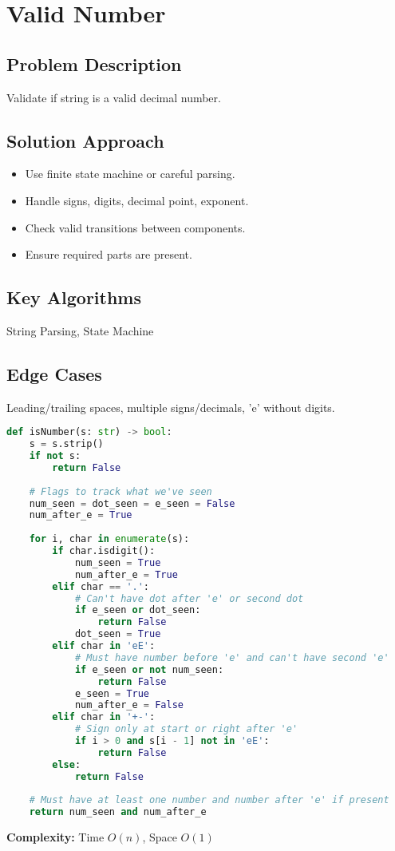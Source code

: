 \documentclass[10pt, a4paper]{article}
\begin{document}
\section{Valid Number}
\subsection*{Problem Description}
Validate if string is a valid decimal number.

\subsection*{Solution Approach}
\begin{itemize}
    \item Use finite state machine or careful parsing.
    \item Handle signs, digits, decimal point, exponent.
    \item Check valid transitions between components.
    \item Ensure required parts are present.
\end{itemize}

\subsection*{Key Algorithms}
String Parsing, State Machine

\subsection*{Edge Cases}
Leading/trailing spaces, multiple signs/decimals, 'e' without digits.

\begin{lstlisting}[language=Python]
def isNumber(s: str) -> bool:
    s = s.strip()
    if not s:
        return False
    
    # Flags to track what we've seen
    num_seen = dot_seen = e_seen = False
    num_after_e = True
    
    for i, char in enumerate(s):
        if char.isdigit():
            num_seen = True
            num_after_e = True
        elif char == '.':
            # Can't have dot after 'e' or second dot
            if e_seen or dot_seen:
                return False
            dot_seen = True
        elif char in 'eE':
            # Must have number before 'e' and can't have second 'e'
            if e_seen or not num_seen:
                return False
            e_seen = True
            num_after_e = False
        elif char in '+-':
            # Sign only at start or right after 'e'
            if i > 0 and s[i - 1] not in 'eE':
                return False
        else:
            return False
    
    # Must have at least one number and number after 'e' if present
    return num_seen and num_after_e
\end{lstlisting}
\textbf{Complexity:} Time $O(n)$, Space $O(1)$
\end{document}
